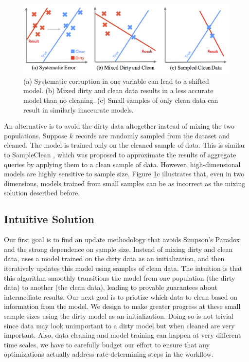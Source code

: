 \begin{figure}[ht!]
\centering
 \includegraphics[width=\columnwidth]{figs/update-arch.png}
 \caption{(a) Systematic corruption in one variable can lead to a shifted model. 
 (b) Mixed dirty and clean data results in a less accurate model than no cleaning.
(c) Small samples of only clean data can result in similarly inaccurate models. \label{update-arch1}}
\end{figure}

An alternative is to avoid the dirty data altogether instead of mixing the two populations.
Suppose $k$ records are randomly sampled from the dataset and cleaned.
The model is trained only on the cleaned sample of data.
This is similar to SampleClean \cite{wang1999sample}, which was proposed to approximate the results of aggregate queries by applying them to a clean sample of data.
However, high-dimensional models are highly sensitive to sample size.
Figure \ref{update-arch1}c illustrates that, even in two dimensions, models trained from small samples can be as incorrect as the mixing solution described before.

\subsection{Intuitive Solution}
Our first goal is to find an update methodology that avoids Simpson's Paradox and the strong dependence on sample size.
Instead of mixing dirty and clean data, \sys uses a model trained on the dirty data as an initialization, and then iteratively updates this model using samples of clean data.
The intuition is that this algorithm smoothly transitions the model from one population (the dirty data) to another (the clean data), leading to provable guarantees about intermediate results.
Our next goal is to priotize which data to clean based on information from the model.
We design \sys to make greater progress at these small sample sizes using the dirty model as an initialization.
Doing so is not trivial since data may look unimportant to a dirty model but when cleaned are very important.
Also, data cleaning and model training can happen at very different time scales, we have to carefully budget our effort to ensure that any optimizations actually address rate-determining steps in the workflow.


